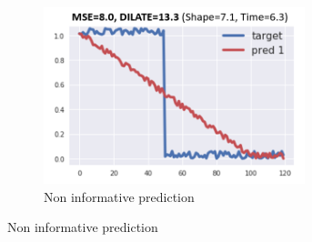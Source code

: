 \begin{figure}[h!]
  \centering
  \begin{subfigure}[b]{0.3\textwidth}
    \centering
    \caption{Non informative prediction}
    \label{fig:dilate-non-informative}
    \includegraphics[width=\textwidth]{./figs/illustrations/dilate_ex1.png}
    \hfill
  \end{subfigure}


\end{figure}
